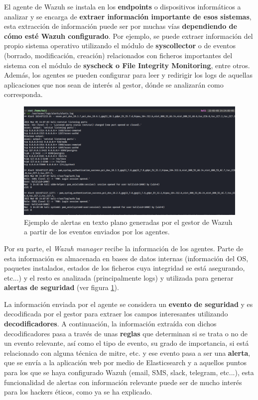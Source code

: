El agente de Wazuh se instala en los \textbf{endpoints} o dispositivos informáticos a analizar y se encarga de \textbf{extraer información importante de esos sistemas}, esta extracción de información puede ser por muchas vías \textbf{dependiendo de cómo esté Wazuh configurado}. Por ejemplo, se puede extraer información del propio sistema operativo utilizando el módulo de \textbf{syscollector} o de eventos (borrado, modificación, creación) relacionados con ficheros importantes del sistema con el módulo de \textbf{syscheck o File Integrity Monitoring}, entre otros. Además, los agentes se pueden configurar para leer y redirigir los logs de aquellas aplicaciones que nos sean de interés al gestor, dónde se analizarán como corresponda.

\begin{figure}[!hbt]
  \centering
  \includegraphics[width=\textwidth]{imagenes/alerts.png}
  \caption{Ejemplo de alertas en texto plano generadas por el gestor de Wazuh a partir de los eventos enviados por los agentes.}
  \label{wazuh_alerts}
\end{figure}


Por su parte, el \textit{Wazuh manager} recibe la información de los agentes. Parte de esta información es almacenada en bases de datos internas (información del OS, paquetes instalados, estados de los ficheros cuya integridad se está asegurando, etc...) y el resto es analizada (principalmente logs) y utilizada para generar \textbf{alertas de seguridad} (ver figura \ref{wazuh_alerts}). 

La información enviada por el agente se considera un \textbf{evento de seguridad} y es decodificada por el gestor para extraer los campos interesantes utilizando \textbf{decodificadores}. A continuación, la información extraída con dichos decodificadores pasa a través de unas \textbf{reglas} que determinan si se trata o no de un evento relevante, así como el tipo de evento, su grado de importancia, si está relacionado con alguna técnica de \gls{mitre}, etc. y ese evento pasa a ser una \textbf{alerta}, que se envía a la aplicación web por medio de Elasticsearch y a aquellos puntos para los que se haya configurado Wazuh (email, SMS, slack, telegram, etc...), esta funcionalidad de alertas con información relevante puede ser de mucho interés para los hackers éticos, como ya se ha explicado.

